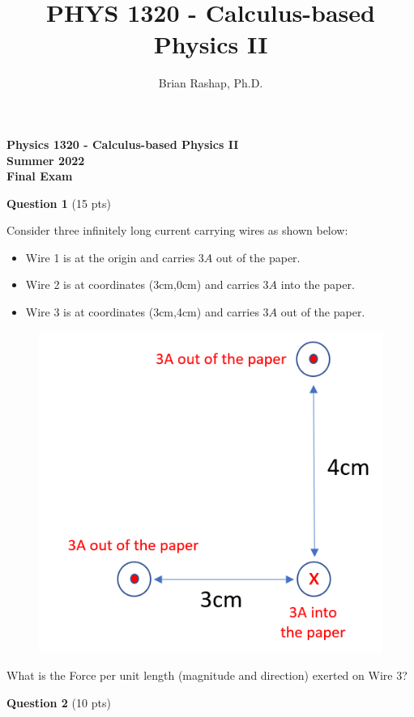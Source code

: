 \documentclass[14pt]{report}
\author{Brian Rashap, Ph.D.}
\title{PHYS 1320 - Calculus-based Physics II}
\begin{document}
\begin{center}
\textbf{Physics 1320 - Calculus-based Physics II \\ Summer 2022 \\ Final Exam}
\end{center}

\textbf{Question 1} (15 pts)



Consider three infinitely long current carrying wires as shown below:
\begin{itemize}
\item Wire 1 is at the origin and carries $3A$ out of the paper.
\item Wire 2 is at coordinates (3cm,0cm) and carries $3A$ into the paper.
\item Wire 3 is at coordinates (3cm,4cm) and carries $3A$ out of the paper.
\end{itemize}

\begin{figure}[H]
\begin{center}
\includegraphics[scale=0.38]{final_1.png}
\end{center}
\end{figure}

What is the Force per unit length (magnitude and direction) exerted on Wire 3?

\textbf{Question 2} (10 pts)
\end{document}
